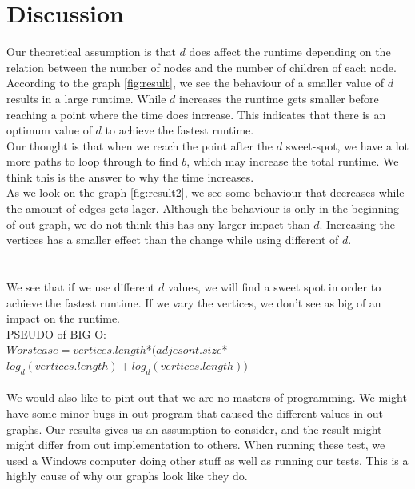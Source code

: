 \documentclass[paper=a4, fontsize=11pt]{scrartcl}
\numberwithin{equation}{section}		%
\numberwithin{figure}{section}			%
\numberwithin{table}{section}				%
\begin{document}
\section{Discussion}
Our theoretical assumption is that $d$ does affect the runtime depending on the relation between the number of nodes and the number of children of each node. According to the graph \ref{fig:result}, we see the behaviour of a smaller value of $d$ results in a large runtime. While $d$ increases the runtime gets smaller before reaching a point where the time does increase. This indicates that there is an optimum value of $d$ to achieve the fastest runtime.\\

Our thought is that when we reach the point after the $d$ sweet-spot, we have a lot more paths to loop through to find $b$, which may increase the total runtime. We think this is the answer to why the time increases.\\

As we look on the graph \ref{fig:result2}, we see some behaviour that decreases while the amount of edges gets lager. Although the behaviour is only in the beginning of out graph, we do not think this has any larger impact than $d$. 
Increasing the vertices has a smaller effect than the change while using different of $d$. \\
\\~\\
We see that if we use different $d$ values, we will find a sweet spot in order to achieve the fastest runtime. If we vary the vertices, we don't see as big of an impact on the runtime.
\\
PSEUDO of BIG O:\\
$
Worst case = vertices.length $*$ (adjesont.size $*$ log_d(vertices.length) + log_d(vertices.length))
$\\~\\
We would also like to pint out that we are no masters of programming. We might have some minor bugs in out program that caused the different values in out graphs. Our results gives us an assumption to consider, and the result might might differ from out implementation to others. When running these test, we used a Windows computer doing other stuff as well as running our tests. This is a highly cause of why our graphs look like they do.
\end{document}

